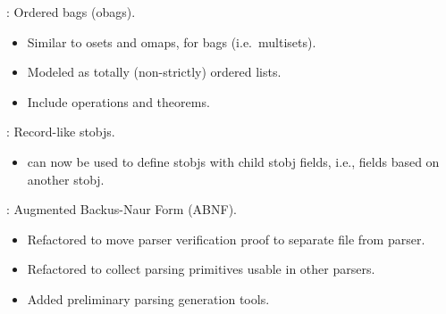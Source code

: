 
\begin{frame}

\newlibtitle

:
Ordered bags (obags).
\begin{itemize}
\item Similar to osets and omaps, for bags (i.e.\ multisets).
\item Modeled as totally (non-strictly) ordered lists.
\item Include operations and theorems.
\end{itemize}

\end{frame}


\begin{frame}

\implibtitle

:
Record-like stobjs.
\begin{itemize}
\item {} can now be used to define stobjs with child
      stobj fields, i.e., fields based on another stobj.
\end{itemize}

\end{frame}


\begin{frame}

\implibtitle

:
Augmented Backus-Naur Form (ABNF).
\begin{itemize}
\item Refactored to move parser verification proof to separate file from parser.
\item Refactored to collect parsing primitives usable in other parsers.
\item Added preliminary parsing generation tools.
\end{itemize}

\end{frame}


